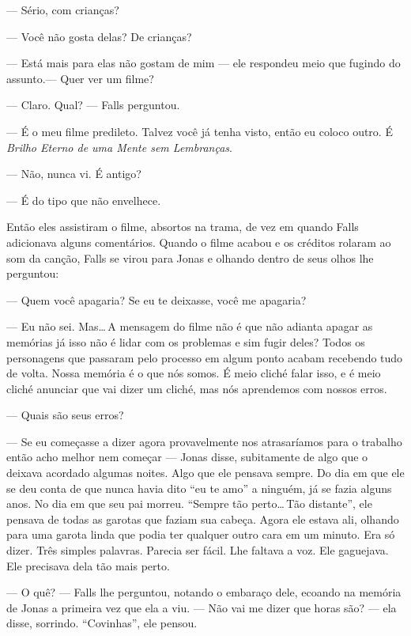 --- Sério, com crianças?

--- Você não gosta delas? De crianças?

--- Está mais para elas não gostam de mim --- ele respondeu\mudanca{,} meio que fugindo do assunto.--- Quer ver um filme?

--- Claro. Qual? --- Falls perguntou.

--- É o meu filme predileto. Talvez você já tenha visto, então eu coloco outro. É \emph{Brilho Eterno de uma Mente sem Lembranças}.

--- Não, nunca vi. É antigo?

--- É do tipo que não envelhece.

Então eles assistiram o filme, absortos na trama, de vez em quando Falls adicionava alguns comentários. Quando o filme acabou e os créditos rolaram ao som da canção, Falls se virou para Jonas e\mudanca{,} olhando dentro de seus olhos\mudanca{,} lhe perguntou:

--- Quem você apagaria? Se eu te deixasse, você me apagaria?

---  Eu não sei. Mas\ldots\,A mensagem do filme não é que não adianta apagar as memórias já isso não é lidar com os problemas e sim fugir deles? Todos os personagens que passaram pelo processo em algum ponto acabam recebendo tudo de volta. Nossa memória é o que nós somos. É meio cliché falar isso, e é meio cliché anunciar que vai dizer um cliché, mas nós aprendemos com nossos erros.

---  Quais são seus erros?

---  Se eu começasse a dizer agora provavelmente nos atrasaríamos para o trabalho\mudanca{,} então acho melhor nem começar ---  Jonas disse, subitamente  de algo que o deixava acordado algumas noites. Algo que ele pensava sempre. Do dia em que ele se deu conta de que nunca havia dito ``eu te amo'' a ninguém, já se fazia alguns anos. No dia em que seu pai morreu. ``Sempre tão perto\ldots\,Tão distante'', ele pensava de todas as garotas que faziam sua cabeça. Agora ele estava ali, olhando para uma garota linda\mudanca{,} que podia ter qualquer outro cara em um minuto. Era só dizer. Três simples palavras. Parecia ser fácil. Lhe faltava a voz. Ele gaguejava. Ele precisava dela tão mais perto.

--- O quê? --- Falls lhe perguntou, notando o embaraço dele, ecoando na memória de Jonas a primeira vez que ela a viu. --- Não vai me dizer que horas são? --- ela disse, sorrindo. ``Covinhas'', ele pensou.

